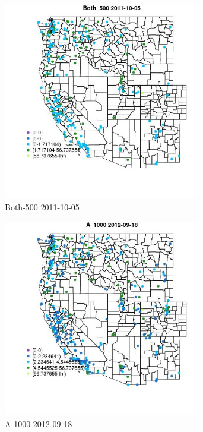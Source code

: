 \clearpage 

\begin{figure} 
\centering  
\includegraphics[width=0.77\textwidth]{Code_Outputs/ML_input_report_ML_input_PM25_Step5_part_d_de_duplicated_aves_ML_input_MapObsBoth_5002011-10-05.jpg} 
\caption{\label{fig:ML_input_report_ML_input_PM25_Step5_part_d_de_duplicated_aves_ML_inputMapObsBoth_5002011-10-05}Both-500 2011-10-05} 
\end{figure} 
 

\begin{figure} 
\centering  
\includegraphics[width=0.77\textwidth]{Code_Outputs/ML_input_report_ML_input_PM25_Step5_part_d_de_duplicated_aves_ML_input_MapObsA_10002012-09-18.jpg} 
\caption{\label{fig:ML_input_report_ML_input_PM25_Step5_part_d_de_duplicated_aves_ML_inputMapObsA_10002012-09-18}A-1000 2012-09-18} 
\end{figure} 
 


